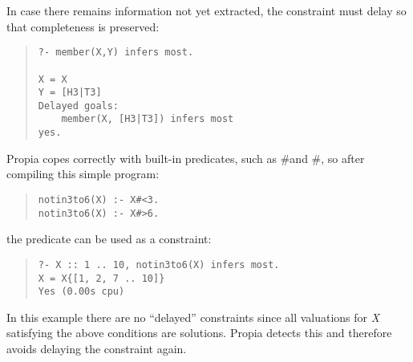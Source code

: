 In case there remains information not yet extracted, the constraint
must delay so that completeness is preserved:
\begin{quote}
\begin{verbatim}
?- member(X,Y) infers most.

X = X
Y = [H3|T3]
Delayed goals:
    member(X, [H3|T3]) infers most
yes.
\end{verbatim}
\end{quote}
Propia copes correctly with built-in predicates, such as \#\gt and
\#\lt, so after compiling this simple program:
\begin{quote}
\begin{verbatim}
notin3to6(X) :- X#<3.
notin3to6(X) :- X#>6.
\end{verbatim}
\end{quote}
the predicate can be used as a constraint:
\begin{quote}
\begin{verbatim}
?- X :: 1 .. 10, notin3to6(X) infers most.
X = X{[1, 2, 7 .. 10]}
Yes (0.00s cpu)
\end{verbatim}
\end{quote}
In this example there are no ``delayed'' constraints since all valuations for
{\em X} satisfying the above conditions are solutions.  Propia
detects this and therefore avoids delaying the constraint
again.

